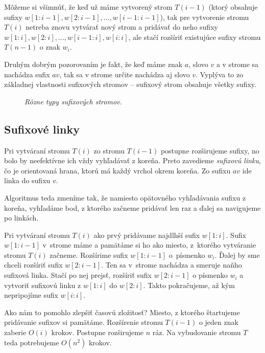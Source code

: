 Môžeme si všimnúť, že keď už máme vytvorený strom 
$T(i-1)$ (ktorý obsahuje sufixy $w[1:{i-1}], w[2:{i-1}], \ldots, 
w[{i-1}:{i-1}]$), tak pre vytvorenie stromu $T(i)$ netreba znovu vytvárať nový 
strom a pridávať do neho sufixy $w[1:i], w[2:i], \ldots, w[{i-1}:i], w[i:i]$, 
ale stačí rozšíriť existujúce sufixy stromu $T(n-1)$ o znak $w_i$.

Druhým dobrým pozorovaním je fakt, že keď máme znak $a$, slovo $v$ 
a v strome sa nachádza sufix $av$, tak sa v strome určite 
nachádza aj slovo $v$. Vyplýva to zo základnej vlastnosti sufixových stromov 
--  sufixový strom obsahuje všetky sufixy.

\def\wOne{0.6}
\begin{figure}
\centering
{}
\quad
{}
\quad
{}
\caption{\emph{Rôzne typy sufixových stromov.}}
\label{img:sxk}
\end{figure}
 
\subsection{Sufixové linky}

Pri vytváraní stromu $T(i)$ zo stromu $T(i-1)$ postupne rozširujeme sufixy, no 
bolo by neefektívne ich vždy vyhľadávať z koreňa. Preto zavedieme 
\emph{sufixovú linku}, čo je orientovaná hrana, ktorú má každý vrchol okrem 
koreňa. Zo sufixu $av$ ide linka do sufixu $v$. 

Algoritmus teda zmeníme tak, že namiesto opätovného vyhľadávania sufixu z 
koreňa, vyhľadáme bod, z ktorého začneme pridávať len raz a ďalej sa 
navigujeme po linkách. 

Pri vytváraní stromu $T(i)$ ako prvý pridávame najdlhší sufix $w[1:i]$. Sufix 
$w[1:i-1]$ v~strome máme a pamätáme si ho ako miesto, z~ktorého vytváranie 
stromu $T(i)$ začneme. Rozšírime sufix $w[1:i-1]$ o~písmenko $w_i$. Ďalej by sme 
chceli rozšíriť sufix $w[2:i-1]$. Ten sa v~strome nachádza a smeruje naňho 
sufixová linka. Stačí po nej prejsť, rozšíriť sufix $w[2:i-1]$ o písmenko 
$w_i$ a vytvoriť sufixovú linku z $w[1:i]$ do $w[2:i]$. Takto pokračujeme, až 
kým nepripojíme sufix $w[i:i]$.

Ako nám to pomohlo zlepšiť časovú zložitosť? Miesto, z ktorého štartujeme 
pridávanie sufixov si pamätáme. Rozšírenie stromu $T(i-1)$ o jeden znak 
zaberie $O(i)$ krokov. Postupne rozširujeme $n$ ráz. Na vybudovanie stromu $T$ 
teda potrebujeme $O(n^2)$ krokov.

